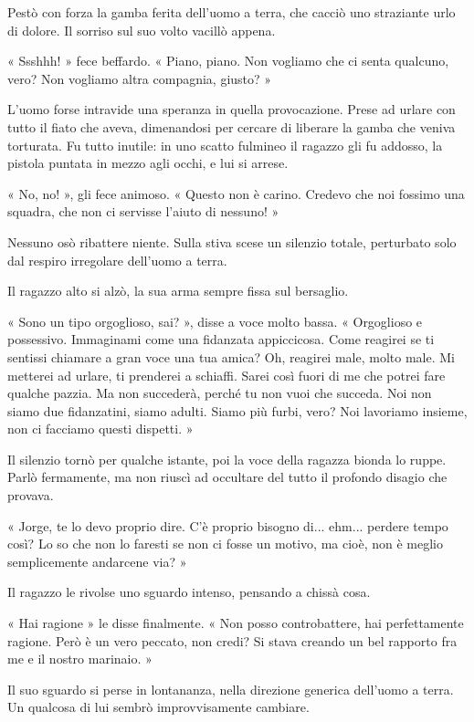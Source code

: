 Pestò con forza la gamba ferita dell'uomo a terra, che cacciò uno straziante urlo di dolore. Il sorriso sul suo volto vacillò appena.

« Ssshhh! » fece beffardo. « Piano, piano. Non vogliamo che ci senta qualcuno, vero? Non vogliamo altra compagnia, giusto? »

L'uomo forse intravide una speranza in quella provocazione. Prese ad urlare con tutto il fiato che aveva, dimenandosi per cercare di liberare la gamba che veniva torturata. Fu tutto inutile: in uno scatto fulmineo il ragazzo gli fu addosso, la pistola puntata in mezzo agli occhi, e lui si arrese.

« No, no! », gli fece animoso. « Questo non è carino. Credevo che noi fossimo una squadra, che non ci servisse l'aiuto di nessuno! »

Nessuno osò ribattere niente. Sulla stiva scese un silenzio totale, perturbato solo dal respiro irregolare dell'uomo a terra.

Il ragazzo alto si alzò, la sua arma sempre fissa sul bersaglio.

« Sono un tipo orgoglioso, sai? », disse a voce molto bassa. « Orgoglioso e possessivo. Immaginami come una fidanzata appiccicosa. Come reagirei se ti sentissi chiamare a gran voce una tua amica? Oh, reagirei male, molto male. Mi metterei ad urlare, ti prenderei a schiaffi. Sarei così fuori di me che potrei fare qualche pazzia. Ma non succederà, perché tu non vuoi che succeda. Noi non siamo due fidanzatini, siamo adulti. Siamo più furbi, vero? Noi lavoriamo insieme, non ci facciamo questi dispetti. »

Il silenzio tornò per qualche istante, poi la voce della ragazza bionda lo ruppe. Parlò fermamente, ma non riuscì ad occultare del tutto il profondo disagio che provava.

« Jorge, te lo devo proprio dire. C'è proprio bisogno di... ehm... perdere tempo così? Lo so che non lo faresti se non ci fosse un motivo, ma cioè, non è meglio semplicemente andarcene via? »

Il ragazzo le rivolse uno sguardo intenso, pensando a chissà cosa.

« Hai ragione » le disse finalmente. « Non posso controbattere, hai perfettamente ragione. Però è un vero peccato, non credi? Si stava creando un bel rapporto fra me e il nostro marinaio. »

Il suo sguardo si perse in lontananza, nella direzione generica dell'uomo a terra. Un qualcosa di lui sembrò improvvisamente cambiare.

